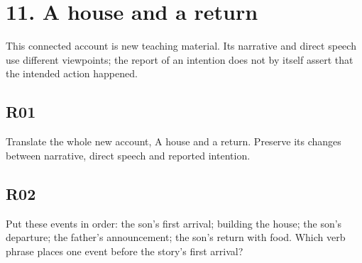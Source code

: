 \section*{11. A house and a return}

This connected account is new teaching material. Its narrative and direct speech use different viewpoints; the report of an intention does not by itself assert that the intended action happened.

\par\begin{minipage}{\linewidth}\raggedright
{}
\end{minipage}\par

\subsection*{R01}

\par\begin{minipage}{\linewidth}\raggedright
Translate the whole new account, A house and a return. Preserve its changes between narrative, direct speech and reported intention.

\end{minipage}\par\addvspace{4pt}

\subsection*{R02}

\par\begin{minipage}{\linewidth}\raggedright
Put these events in order: the son’s first arrival; building the house; the son’s departure; the father’s announcement; the son’s return with food. Which verb phrase places one event before the story’s first arrival?

\end{minipage}\par\addvspace{4pt}

